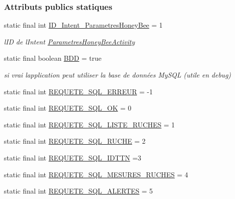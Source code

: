 \subsubsection*{Attributs publics statiques}
\begin{DoxyCompactItemize}
\item 
static final int \hyperlink{classfr_1_1campus_1_1laurainc_1_1honeybee_1_1_honey_bee_a479c42ac63c5c79e26c4836f965171d2}{I\+D\+\_\+\+Intent\+\_\+\+Parametres\+Honey\+Bee} = 1
\begin{DoxyCompactList}\small\item\em l\textquotesingle{}ID de l\textquotesingle{}Intent \hyperlink{classfr_1_1campus_1_1laurainc_1_1honeybee_1_1_parametres_honey_bee_activity}{Parametres\+Honey\+Bee\+Activity} \end{DoxyCompactList}\item 
static final boolean \hyperlink{classfr_1_1campus_1_1laurainc_1_1honeybee_1_1_honey_bee_abfb4f6cc1c8bb793c37ccb8408abc51c}{B\+DD} = true
\begin{DoxyCompactList}\small\item\em si vrai l\textquotesingle{}application peut utiliser la base de données My\+S\+QL (utile en debug) \end{DoxyCompactList}\item 
static final int \hyperlink{classfr_1_1campus_1_1laurainc_1_1honeybee_1_1_honey_bee_a275b7a8582c8193ff444d21928ef7e36}{R\+E\+Q\+U\+E\+T\+E\+\_\+\+S\+Q\+L\+\_\+\+E\+R\+R\+E\+UR} = -\/1
\item 
static final int \hyperlink{classfr_1_1campus_1_1laurainc_1_1honeybee_1_1_honey_bee_a793e7851c6d203b52a1486d1e6c9bbc7}{R\+E\+Q\+U\+E\+T\+E\+\_\+\+S\+Q\+L\+\_\+\+OK} = 0
\item 
static final int \hyperlink{classfr_1_1campus_1_1laurainc_1_1honeybee_1_1_honey_bee_afd5c8c4447e00d9a75eb95f83a62a860}{R\+E\+Q\+U\+E\+T\+E\+\_\+\+S\+Q\+L\+\_\+\+L\+I\+S\+T\+E\+\_\+\+R\+U\+C\+H\+ES} = 1
\item 
static final int \hyperlink{classfr_1_1campus_1_1laurainc_1_1honeybee_1_1_honey_bee_a933d238d27d6b17df6f65bef23a2de1d}{R\+E\+Q\+U\+E\+T\+E\+\_\+\+S\+Q\+L\+\_\+\+R\+U\+C\+HE} = 2
\item 
static final int \hyperlink{classfr_1_1campus_1_1laurainc_1_1honeybee_1_1_honey_bee_a114d1a573571b6a77a2d0e48a0ee3d5c}{R\+E\+Q\+U\+E\+T\+E\+\_\+\+S\+Q\+L\+\_\+\+I\+D\+T\+TN} =3
\item 
static final int \hyperlink{classfr_1_1campus_1_1laurainc_1_1honeybee_1_1_honey_bee_aa6c2993ef079afd106565e2748b72156}{R\+E\+Q\+U\+E\+T\+E\+\_\+\+S\+Q\+L\+\_\+\+M\+E\+S\+U\+R\+E\+S\+\_\+\+R\+U\+C\+H\+ES} = 4
\item 
static final int \hyperlink{classfr_1_1campus_1_1laurainc_1_1honeybee_1_1_honey_bee_a30fce22196d286c02fbcdd7629401c8a}{R\+E\+Q\+U\+E\+T\+E\+\_\+\+S\+Q\+L\+\_\+\+A\+L\+E\+R\+T\+ES} = 5
\end{DoxyCompactItemize}


